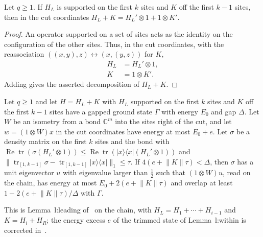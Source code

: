 \begin{lemma}
    \label{thm:chain_gluing_split}
    \leanok
    Let $q\ge1$. If $H_L$ is supported on the first $k$ sites and $K$ off the
    first $k-1$ sites, then in the cut coordinates $H_L+K=H_L'\otimes1+1\otimes K'$.
\end{lemma}

\begin{proof}
    \leanok
    An operator supported on a set of sites acts as the identity on the
    configuration of the other sites. Thus, in the cut coordinates, with
    the reassociation $((x,y),z)\leftrightarrow(x,(y,z))$ for $K$,
    \begin{align}
        H_L & =H_L'\otimes1, \\
        K   & =1\otimes K'.
    \end{align}
    Adding gives the asserted decomposition of $H_L+K$.
\end{proof}

\begin{lemma}
    \label{thm:chain_leading_eigenvector}
    \leanok
    Let $q\ge1$ and let $H=H_L+K$ with $H_L$ supported on the first $k$ sites
    and $K$ off the first $k-1$ sites have a gapped ground state $\Gamma$ with
    energy $E_0$ and gap $\Delta$. Let $W$ be an isometry from a bond
    $\mathbb C^m$ into the sites right of the cut, and let $w=(1\otimes W)x$ in
    the cut coordinates have energy at most $E_0+e$. Let $\sigma$ be a density
    matrix on the first $k$ sites and the bond with
    $\operatorname{Re}\operatorname{tr}(\sigma(H_L'\otimes1))\le
        \operatorname{Re}\operatorname{tr}(\lvert x\rangle\langle x\rvert(H_L'\otimes1))$
    and
    $\lVert\operatorname{tr}_{[1,k-1]}\sigma-\operatorname{tr}_{[1,k-1]}
        \lvert x\rangle\langle x\rvert\rVert_1\le\tau$. If
    $4(e+\lVert K\rVert\tau)<\Delta$, then $\sigma$ has a unit eigenvector $u$
    with eigenvalue larger than $\tfrac12$ such that $(1\otimes W)u$, read on
    the chain, has energy at most $E_0+2(e+\lVert K\rVert\tau)$ and overlap at
    least $1-2(e+\lVert K\rVert\tau)/\Delta$ with $\Gamma$.

    This is Lemma~l:leading of~\cite[lines 493--505]{Landau2015Polynomial} on
    the chain, with $H_L=H_1+\cdots+H_{i-1}$ and $K=H_i+H_R$; the energy excess
    $e$ of the trimmed state of Lemma~l:within is corrected
    in~\cite{gap:lvv13_trimming_energy}.
\end{lemma}


